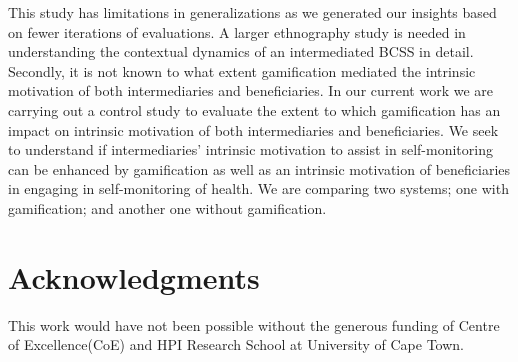 \documentclass{sig-alternate}
\begin{document}
This study has limitations in generalizations as we generated our insights
based on fewer iterations of evaluations. A larger ethnography study is needed
in understanding the contextual dynamics of an intermediated BCSS in detail.
Secondly, it is not known to what extent gamification mediated the intrinsic
motivation of both intermediaries and beneficiaries. In our current work we
are carrying out a control study to evaluate the extent to which gamification
has an impact on intrinsic motivation of both intermediaries and
beneficiaries. We seek to understand if intermediaries' intrinsic motivation
to assist in self-monitoring can be enhanced by gamification as well as an
intrinsic motivation of beneficiaries in engaging in self-monitoring of
health. We are comparing two systems; one with gamification; and another one
without gamification.



\section{Acknowledgments} 

This work would have
not been possible without the generous funding of Centre of Excellence(CoE)
and HPI Research School at University of Cape Town.

%

%
%
\end{document}
